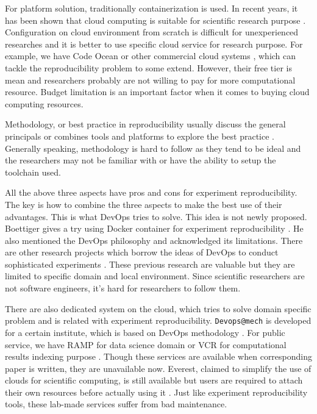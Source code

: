 \documentclass{IEEEcsmag}
\begin{document}
For platform solution, traditionally containerization is used. In recent years, it has been shown that cloud computing is suitable for scientific research purpose \cite{Howe12}. Configuration on cloud environment from scratch is difficult for unexperienced researches and it is better to use specific cloud service for research purpose. For example, we have Code Ocean or other commercial cloud systems \cite{perkel2018data}, which can tackle the reproducibility problem to some extend. However, their free tier is mean and researchers probably are not willing to pay for more computational resource. Budget limitation is an important factor when it comes to buying cloud computing resources.

Methodology, or best practice in reproducibility usually discuss the general principals \cite{stodden2014best} or combines tools and platforms to explore the best practice \cite{QashaCW16}. Generally speaking, methodology is hard to follow as they tend to be ideal and the researchers may not be familiar with or have the ability to setup the toolchain used.  

All the above three aspects have pros and cons for experiment reproducibility. The key is how to combine the three aspects to make the best use of their advantages. This is what DevOps tries to solve. This idea is not newly proposed. Boettiger gives a try using Docker container for experiment reproducibility \cite{Boettiger15}.
He also mentioned the DevOps philosophy and acknowledged its limitations.
There are other research projects which borrow the ideas of DevOps to conduct sophisticated experiments \cite{chwalisz2019walker}. These previous research are valuable but they are limited to specific domain and local environment. Since scientific researchers are not software engineers, it's hard for researchers to follow them. 

There are also dedicated system on the cloud, which tries to solve domain specific problem and is related with experiment reproducibility. \texttt{Devops@mech} is developed for a certain institute, which is based on DevOps methodology \cite{philips2019devops}. For public service, we have    RAMP for data science domain \cite{kegl2018ramp} or VCR for computational results indexing purpose \cite{GavishD12}. Though these services are available when corresponding paper is written, they are unavailable now.
Everest, claimed to simplify the use of clouds for scientific computing, is still available but users are required to attach their own resources before actually using it \cite{VOLKOV2017112}.
Just like experiment reproducibility tools, these lab-made services suffer from bad maintenance.
\end{document}
